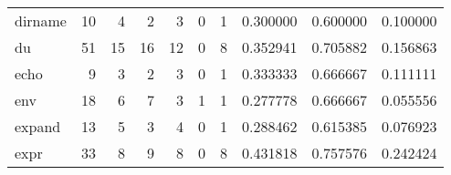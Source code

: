\begin{tabular}{lrrrrrrrrr}
dirname   &                                      10 &                                                  4 &                                                  2 &                                                  3 &                                                  0 &                                                  1 &                                           0.300000 &                               0.600000 &                             0.100000 \\
du        &                                      51 &                                                 15 &                                                 16 &                                                 12 &                                                  0 &                                                  8 &                                           0.352941 &                               0.705882 &                             0.156863 \\
echo      &                                       9 &                                                  3 &                                                  2 &                                                  3 &                                                  0 &                                                  1 &                                           0.333333 &                               0.666667 &                             0.111111 \\
env       &                                      18 &                                                  6 &                                                  7 &                                                  3 &                                                  1 &                                                  1 &                                           0.277778 &                               0.666667 &                             0.055556 \\
expand    &                                      13 &                                                  5 &                                                  3 &                                                  4 &                                                  0 &                                                  1 &                                           0.288462 &                               0.615385 &                             0.076923 \\
expr      &                                      33 &                                                  8 &                                                  9 &                                                  8 &                                                  0 &                                                  8 &                                           0.431818 &                               0.757576 &                             0.242424 \\

\end{tabular}
